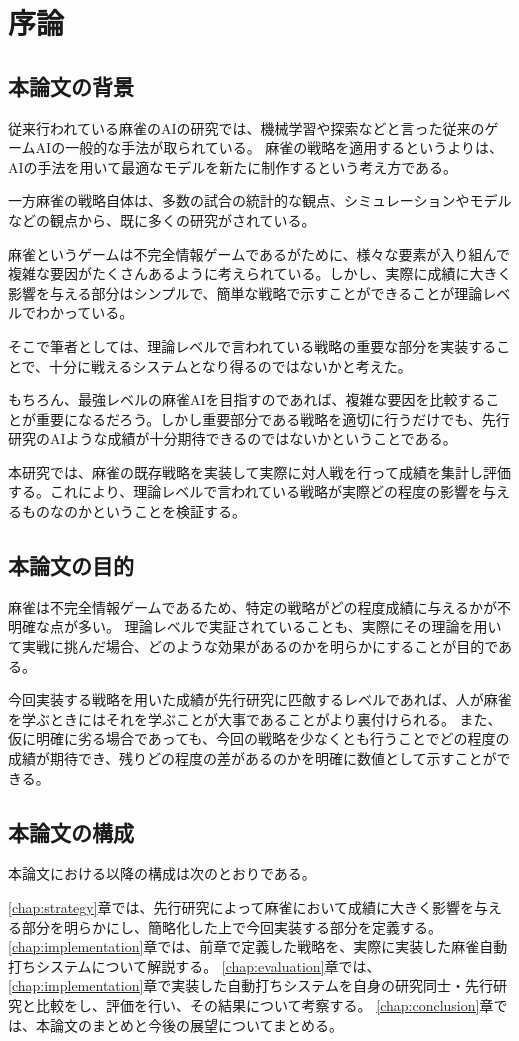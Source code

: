 \chapter{序論}
\label{chap:introduction}

\section{本論文の背景}
従来行われている麻雀のAIの研究では、機械学習や探索などと言った従来のゲームAIの一般的な手法が取られている。
麻雀の戦略を適用するというよりは、AIの手法を用いて最適なモデルを新たに制作するという考え方である。

一方麻雀の戦略自体は、多数の試合の統計的な観点、シミュレーションやモデルなどの観点から、既に多くの研究がされている。

麻雀というゲームは不完全情報ゲームであるがために、様々な要素が入り組んで複雑な要因がたくさんあるように考えられている。しかし、実際に成績に大きく影響を与える部分はシンプルで、簡単な戦略で示すことができることが理論レベルでわかっている。

そこで筆者としては、理論レベルで言われている戦略の重要な部分を実装することで、十分に戦えるシステムとなり得るのではないかと考えた。

もちろん、最強レベルの麻雀AIを目指すのであれば、複雑な要因を比較することが重要になるだろう。しかし重要部分である戦略を適切に行うだけでも、先行研究のAIような成績が十分期待できるのではないかということである。

本研究では、麻雀の既存戦略を実装して実際に対人戦を行って成績を集計し評価する。これにより、理論レベルで言われている戦略が実際どの程度の影響を与えるものなのかということを検証する。

\section{本論文の目的}
麻雀は不完全情報ゲームであるため、特定の戦略がどの程度成績に与えるかが不明確な点が多い。
理論レベルで実証されていることも、実際にその理論を用いて実戦に挑んだ場合、どのような効果があるのかを明らかにすることが目的である。

今回実装する戦略を用いた成績が先行研究に匹敵するレベルであれば、人が麻雀を学ぶときにはそれを学ぶことが大事であることがより裏付けられる。
また、仮に明確に劣る場合であっても、今回の戦略を少なくとも行うことでどの程度の成績が期待でき、残りどの程度の差があるのかを明確に数値として示すことができる。

\section{本論文の構成}
本論文における以降の構成は次のとおりである。

\ref{chap:strategy}章では、先行研究によって麻雀において成績に大きく影響を与える部分を明らかにし、簡略化した上で今回実装する部分を定義する。
\ref{chap:implementation}章では、前章で定義した戦略を、実際に実装した麻雀自動打ちシステムについて解説する。
\ref{chap:evaluation}章では、\ref{chap:implementation}章で実装した自動打ちシステムを自身の研究同士・先行研究と比較をし、評価を行い、その結果について考察する。
\ref{chap:conclusion}章では、本論文のまとめと今後の展望についてまとめる。